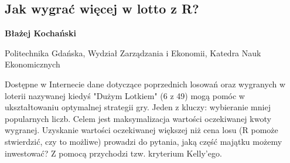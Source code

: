 \documentclass[\main/boa.tex]{subfiles}
\begin{document}
\subsection{Jak wygrać więcej w lotto z R?}

\begin{minipage}{0.915\textwidth}
	\centering
  {\bf {} Błażej Kochański}
\end{minipage}

\vskip 0.3cm

\begin{affiliations}
\begin{minipage}{0.915\textwidth}
\centering
Politechnika Gdańska, Wydział Zarządzania i Ekonomii, Katedra Nauk Ekonomicznych  \\[-2pt]
\end{minipage}
\end{affiliations}

\vskip 0.8cm

 Dostępne w Internecie dane dotyczące poprzednich losowań oraz wygranych w loterii nazywanej kiedyś "Dużym Lotkiem" (6 z 49) mogą pomóc w ukształtowaniu optymalnej strategii gry. Jeden z kluczy: wybieranie mniej popularnych liczb. Celem jest maksymalizacja wartości oczekiwanej kwoty wygranej. Uzyskanie wartości oczekiwanej większej niż cena losu (R pomoże stwierdzić, czy to możliwe) prowadzi do pytania, jaką część majątku możemy inwestować? Z pomocą przychodzi tzw. kryterium Kelly'ego. 
\end{document}

